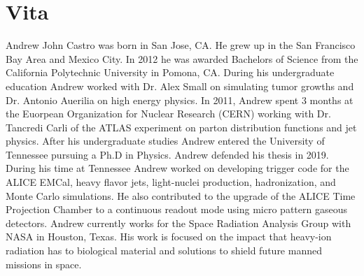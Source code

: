 \chapter*{Vita} \label{ch:vita}
Andrew John Castro was born in San Jose, CA.  He grew up in the San Francisco Bay Area and Mexico City.  In 2012 he was awarded  Bachelors of Science from the California Polytechnic University in Pomona, CA.  During his undergraduate education Andrew worked with Dr. Alex Small on simulating tumor growths and Dr. Antonio Auerilia on high energy physics.  In 2011, Andrew spent 3 months at the Euorpean Organization for Nuclear Research (CERN) working with Dr. Tancredi Carli of the ATLAS experiment on parton distribution functions and jet physics.  
After his undergraduate studies Andrew entered the University of Tennessee pursuing a Ph.D in Physics.  Andrew defended his thesis in 2019.  During his time at Tennessee Andrew worked on developing trigger code for the ALICE EMCal, heavy flavor jets, light-nuclei production, hadronization, and Monte Carlo simulations.  He also contributed to the upgrade of the ALICE Time Projection Chamber to a continuous readout mode using micro pattern gaseous detectors.  
Andrew currently works for the Space Radiation Analysis Group with NASA in Houston, Texas. His work is focused on the impact that heavy-ion radiation has to biological material and solutions to shield future manned missions in space.
